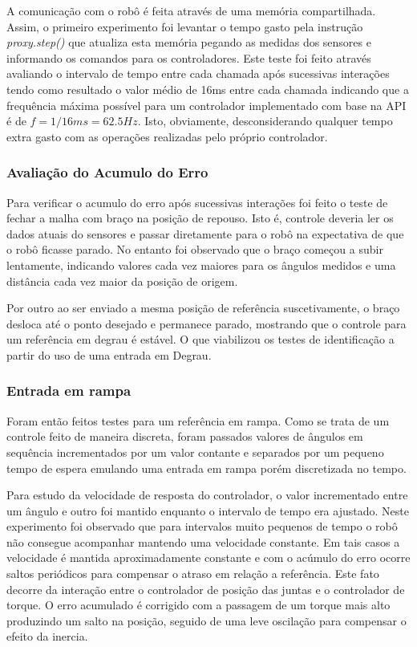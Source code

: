 A comunicação com o robô é feita através de uma memória compartilhada. Assim, o primeiro experimento foi levantar o tempo gasto pela instrução \textit{proxy.step()} que atualiza esta memória pegando as medidas dos sensores e informando os comandos para os controladores. Este teste foi feito através avaliando o intervalo de tempo entre cada chamada após sucessivas interações tendo como resultado o valor médio de 16ms entre cada chamada indicando que a frequência máxima possível para um controlador implementado com base na API é de $f = 1/16ms = 62.5Hz$. Isto, obviamente, desconsiderando qualquer tempo extra gasto com as operações realizadas pelo próprio controlador.

\subsubsection{Avaliação do Acumulo do Erro}

Para verificar o acumulo do erro após sucessivas interações foi feito o teste de fechar a malha com braço na posição de repouso. Isto é, controle deveria ler os dados atuais do sensores e passar diretamente para o robô na expectativa de que o robô ficasse parado. No entanto foi observado que o braço começou a subir lentamente, indicando valores cada vez maiores para os ângulos medidos e uma distância cada vez maior da posição de origem.

Por outro ao ser enviado a mesma posição de referência suscetivamente, o braço desloca até o ponto desejado e permanece parado, mostrando que o controle para um referência em degrau é estável. O que viabilizou os testes de identificação a partir do uso de uma entrada em Degrau.

\subsubsection{Entrada em rampa}

Foram então feitos testes para um referência em rampa. Como se trata de um controle feito de maneira discreta, foram passados valores de ângulos em sequência incrementados por um valor contante e separados por um pequeno tempo de espera emulando uma entrada em rampa porém discretizada no tempo.

Para estudo da velocidade de resposta do controlador, o valor incrementado entre um ângulo e outro foi mantido enquanto o intervalo de tempo era ajustado. Neste experimento foi observado que para intervalos muito pequenos de tempo o robô não consegue acompanhar mantendo uma velocidade constante. Em tais casos a velocidade é mantida aproximadamente constante e com o acúmulo do erro ocorre saltos periódicos para compensar o atraso em relação a referência. Este fato decorre da interação entre o controlador de posição das juntas e o controlador de torque. O erro acumulado é corrigido com a passagem de um torque mais alto produzindo um salto na posição, seguido de uma leve oscilação para compensar o efeito da inercia.

